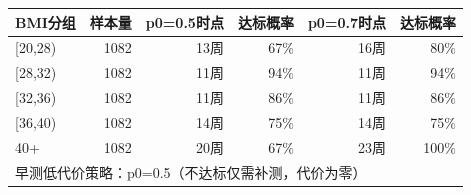 \begin{tabular}{lrrrrr}
\toprule
BMI分组 & 样本量 & p0=0.5时点 & 达标概率 & p0=0.7时点 & 达标概率 \\
\midrule
[20,28) & 1082 & 13周 & 67\ensuremath{\%} & 16周 & 80\ensuremath{\%} \\
[28,32) & 1082 & 11周 & 94\ensuremath{\%} & 11周 & 94\ensuremath{\%} \\
[32,36) & 1082 & 11周 & 86\ensuremath{\%} & 11周 & 86\ensuremath{\%} \\
[36,40) & 1082 & 14周 & 75\ensuremath{\%} & 14周 & 75\ensuremath{\%} \\
40+ & 1082 & 20周 & 67\ensuremath{\%} & 23周 & 100\ensuremath{\%} \\
\midrule
\multicolumn{6}{l}{\small 早测低代价策略：p0=0.5（不达标仅需补测，代价为零）}
\end{tabular}
